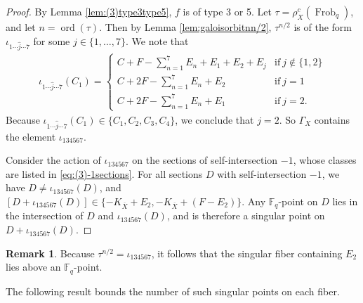 \documentclass[a4paper, 11pt, reqno]{amsart}
\numberwithin{equation}{section} \numberwithin{figure}{section}
\DeclareMathOperator{\ord}{ord}
\DeclareMathOperator{\Pic}{Pic}
\DeclareMathOperator{\Frob}{Frob}
\def \F {{\mathbb F}}
\def \P {{\mathbb P}}
\newcommand{\ra}{\rightarrow}
\newtheorem{proposition}[lemma]{Proposition}
\theoremstyle{definition}
\newtheorem{remark}[lemma]{Remark}
\numberwithin{lemma}{section}
\begin{document}
\begin{proof}
    By Lemma \ref{lem:(3)type3type5}, $f$ is of type 3 or 5. Let $\tau = \rho_X^c(\Frob_q)$, and let $n = \ord(\tau)$. Then by Lemma \ref{lem:galoisorbitnn/2}, $\tau^{n/2}$ is of the form $\iota_{1\cdots \hat{j} \cdots 7}$ for some $j \in \{1, \ldots, 7\}$. We note that
    \begin{align*}
        \iota_{1\cdots \hat{j} \cdots 7}(C_1) = \begin{cases}
            C + F - \sum_{n=1}^7 E_n + E_1 + E_2 + E_j &\text{if} \ j \notin \{1, 2\}\\
            C + 2F - \sum_{n=1}^7 E_n + E_2 &\text{if} \ j = 1\\
            C + 2F - \sum_{n=1}^7 E_n + E_1 &\text{if} \ j = 2.
        \end{cases}
    \end{align*}
    Because $\iota_{1\cdots \hat{j} \cdots 7}(C_1) \in \{C_1, C_2, C_3, C_4\}$, we conclude that $j = 2$. So $\Gamma_X$ contains the element $\iota_{134567}$. 
    
    Consider the action of $\iota_{134567}$ on the sections of self-intersection $-1$, whose classes are listed in \eqref{eq:(3)-1sections}. For all sections $D$ with self-intersection $-1$, we have $D \neq \iota_{134567}(D)$, and $[D + \iota_{134567}(D)] \in \{-K_{\overline{X}} + E_2, -K_{\overline{X}} + (F - E_2)\}$. Any $\F_q$-point on $D$ lies in the intersection of $D$ and $\iota_{134567}(D)$, and is therefore a singular point on $D + \iota_{134567}(D)$.
\end{proof}

\begin{remark}
    Because $\tau^{n/2} = \iota_{134567}$, it follows that the singular fiber containing $E_2$ lies above an $\F_q$-point.\end{remark}

 The following result bounds the number of such singular points on each fiber.

\end{document}
